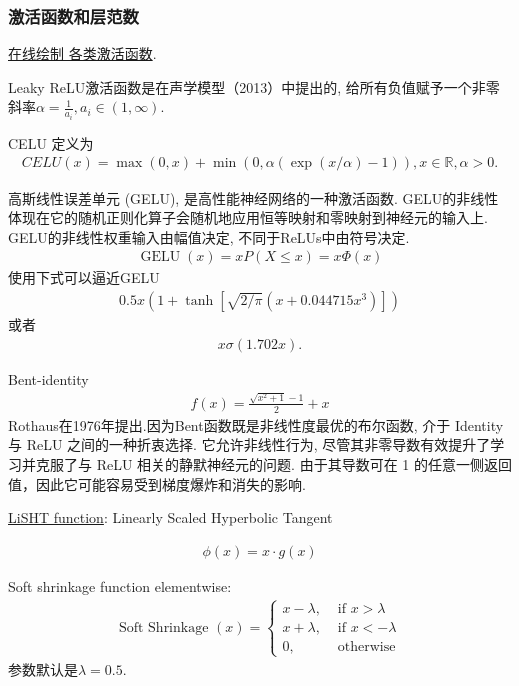 \subsubsection{激活函数和层范数}
\href{https://dashee87.github.io/deep\%20learning/visualising-activation-functions-in-neural-networks/}{在线绘制 各类激活函数}.
\begin{remark}
Leaky ReLU激活函数是在声学模型（2013）中提出的, 给所有负值赋予一个非零斜率$\alpha=\frac 1 {a_i}, a_i\in (1,\infty)$.
\end{remark}
\begin{remark}
CELU \cite{hendrycks2016gelu} 定义为
\begin{align}
 CELU(x)=\max(0,x)+\min(0,\alpha(\exp(x/\alpha)-1)), x\in \mathbb R, \alpha> 0.
\end{align}
\end{remark}
\begin{remark}
高斯线性误差单元 (GELU), 是高性能神经网络的一种激活函数. GELU的非线性体现在它的随机正则化算子会随机地应用恒等映射和零映射到神经元的输入上. 
GELU的非线性权重输入由幅值决定, 不同于ReLUs中由符号决定.
\begin{align}
  \operatorname{GELU}(x)=x P(X \leq x)=x \Phi(x)
\end{align}
使用下式可以逼近GELU
\begin{align}
  0.5 x\left(1+\tanh \left[\sqrt{2 / \pi}\left(x+0.044715 x^{3}\right)\right]\right)
\end{align}
或者
\begin{align}
  x \sigma(1.702 x).
\end{align}
\end{remark}

Bent-identity
\begin{align}
  f(x) = \frac{\sqrt{x^2 + 1} - 1}{2} +x
\end{align}
Rothaus在1976年提出.因为Bent函数既是非线性度最优的布尔函数, 介于 Identity 与 ReLU 之间的一种折衷选择. 它允许非线性行为, 尽管其非零导数有效提升了学习并克服了与 ReLU 相关的静默神经元的问题. 
由于其导数可在 1 的任意一侧返回值，因此它可能容易受到梯度爆炸和消失的影响.

\href{https://arxiv.org/pdf/1901.05894.pdf}{LiSHT function}: Linearly Scaled Hyperbolic Tangent

\begin{align}
  \phi(x)=x \cdot g(x)
\end{align}

Soft shrinkage function elementwise:
\begin{align}
\text { Soft Shrinkage }(x)=\left\{\begin{array}{ll}
{x-\lambda,} & {\text { if } x>\lambda} \\
{x+\lambda,} & {\text { if } x<-\lambda} \\
{0,} & {\text { otherwise }}
\end{array}\right.
\end{align}
参数默认是$\lambda=0.5$.

